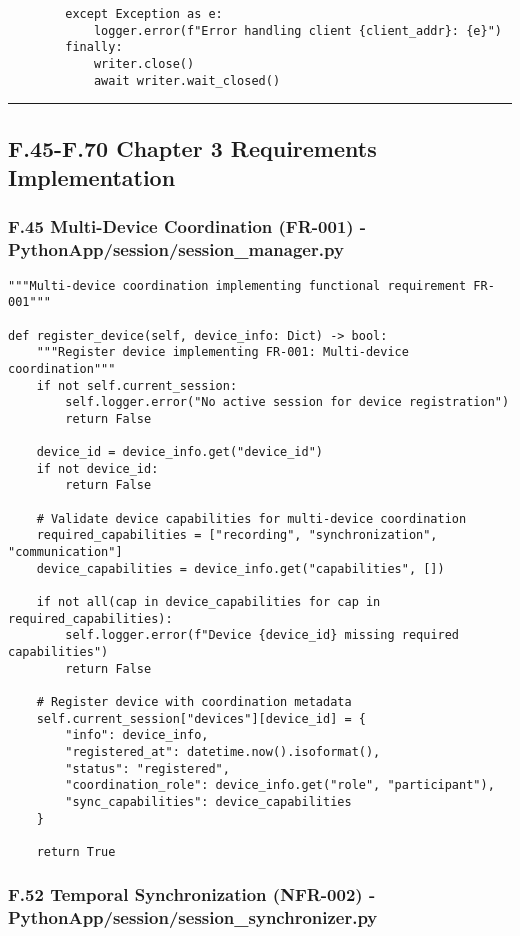 \documentclass[12pt,a4paper]{article}
\begin{document}
{{\begin{verbatim}
        except Exception as e:
            logger.error(f"Error handling client {client_addr}: {e}")
        finally:
            writer.close()
            await writer.wait_closed()
\end{verbatim}

\hrule

\subsection{F.45-F.70 Chapter 3 Requirements Implementation}

\subsubsection{F.45 Multi-Device Coordination (FR-001) - PythonApp/session/session_manager.py}

\begin{verbatim}
"""Multi-device coordination implementing functional requirement FR-001"""

def register_device(self, device_info: Dict) -> bool:
    """Register device implementing FR-001: Multi-device coordination"""
    if not self.current_session:
        self.logger.error("No active session for device registration")
        return False
    
    device_id = device_info.get("device_id")
    if not device_id:
        return False
    
    # Validate device capabilities for multi-device coordination
    required_capabilities = ["recording", "synchronization", "communication"]
    device_capabilities = device_info.get("capabilities", [])
    
    if not all(cap in device_capabilities for cap in required_capabilities):
        self.logger.error(f"Device {device_id} missing required capabilities")
        return False
    
    # Register device with coordination metadata
    self.current_session["devices"][device_id] = {
        "info": device_info,
        "registered_at": datetime.now().isoformat(),
        "status": "registered",
        "coordination_role": device_info.get("role", "participant"),
        "sync_capabilities": device_capabilities
    }
    
    return True
\end{verbatim}

\subsubsection{F.52 Temporal Synchronization (NFR-002) - PythonApp/session/session_synchronizer.py}

}}
\end{document}

